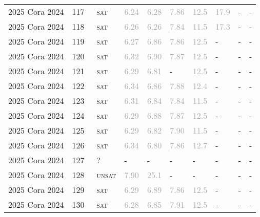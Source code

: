 \begin{center}
{\begin{longtable}{@{}llllllllll@{}}
2025 Cora 2024 & 117 & ~\textsc{sat} & \textcolor{darkgray}{6.24} & \textcolor{darkgray}{6.28} & \textcolor{darkgray}{7.86} & \textcolor{darkgray}{12.5} & \textcolor{darkgray}{17.9} & - & - \\
2025 Cora 2024 & 118 & ~\textsc{sat} & \textcolor{darkgray}{6.26} & \textcolor{darkgray}{6.26} & \textcolor{darkgray}{7.84} & \textcolor{darkgray}{11.5} & \textcolor{darkgray}{17.3} & - & - \\
2025 Cora 2024 & 119 & ~\textsc{sat} & \textcolor{darkgray}{6.27} & \textcolor{darkgray}{6.86} & \textcolor{darkgray}{7.86} & \textcolor{darkgray}{12.5} & - & - & - \\
2025 Cora 2024 & 120 & ~\textsc{sat} & \textcolor{darkgray}{6.32} & \textcolor{darkgray}{6.90} & \textcolor{darkgray}{7.87} & \textcolor{darkgray}{12.5} & - & - & - \\
2025 Cora 2024 & 121 & ~\textsc{sat} & \textcolor{darkgray}{6.29} & \textcolor{darkgray}{6.81} & - & \textcolor{darkgray}{12.5} & - & - & - \\
2025 Cora 2024 & 122 & ~\textsc{sat} & \textcolor{darkgray}{6.34} & \textcolor{darkgray}{6.86} & \textcolor{darkgray}{7.88} & \textcolor{darkgray}{12.4} & - & - & - \\
2025 Cora 2024 & 123 & ~\textsc{sat} & \textcolor{darkgray}{6.31} & \textcolor{darkgray}{6.84} & \textcolor{darkgray}{7.84} & \textcolor{darkgray}{11.5} & - & - & - \\
2025 Cora 2024 & 124 & ~\textsc{sat} & \textcolor{darkgray}{6.29} & \textcolor{darkgray}{6.88} & \textcolor{darkgray}{7.87} & \textcolor{darkgray}{12.5} & - & - & - \\
2025 Cora 2024 & 125 & ~\textsc{sat} & \textcolor{darkgray}{6.29} & \textcolor{darkgray}{6.82} & \textcolor{darkgray}{7.90} & \textcolor{darkgray}{11.5} & - & - & - \\
2025 Cora 2024 & 126 & ~\textsc{sat} & \textcolor{darkgray}{6.34} & \textcolor{darkgray}{6.80} & \textcolor{darkgray}{7.86} & \textcolor{darkgray}{12.7} & - & - & - \\
2025 Cora 2024 & 127 & ~? & - & - & - & - & - & - & - \\
2025 Cora 2024 & 128 & ~\textsc{unsat} & \textcolor{darkgray}{7.90} & \textcolor{darkgray}{25.1} & - & - & - & - & - \\
2025 Cora 2024 & 129 & ~\textsc{sat} & \textcolor{darkgray}{6.29} & \textcolor{darkgray}{6.89} & \textcolor{darkgray}{7.86} & \textcolor{darkgray}{12.5} & - & - & - \\
2025 Cora 2024 & 130 & ~\textsc{sat} & \textcolor{darkgray}{6.28} & \textcolor{darkgray}{6.85} & \textcolor{darkgray}{7.91} & \textcolor{darkgray}{12.5} & - & - & - \\

\end{longtable}}
\end{center}
